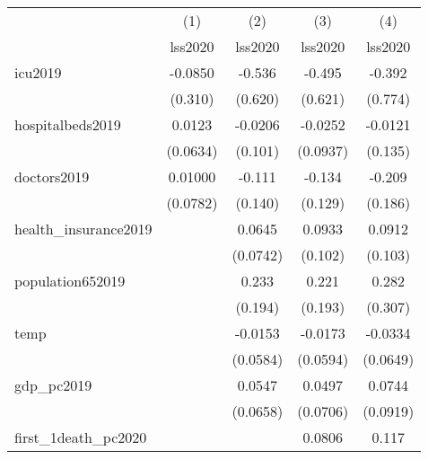 {
\def\sym#1{\ifmmode^{#1}\else\(^{#1}\)\fi}
\begin{tabular}{l*{4}{c}}
\hline\hline
            &\multicolumn{1}{c}{(1)}&\multicolumn{1}{c}{(2)}&\multicolumn{1}{c}{(3)}&\multicolumn{1}{c}{(4)}\\
            &\multicolumn{1}{c}{lss2020}&\multicolumn{1}{c}{lss2020}&\multicolumn{1}{c}{lss2020}&\multicolumn{1}{c}{lss2020}\\
\hline
icu2019     &     -0.0850         &      -0.536         &      -0.495         &      -0.392         \\
            &     (0.310)         &     (0.620)         &     (0.621)         &     (0.774)         \\
[1em]
hospitalbeds2019&      0.0123         &     -0.0206         &     -0.0252         &     -0.0121         \\
            &    (0.0634)         &     (0.101)         &    (0.0937)         &     (0.135)         \\
[1em]
doctors2019 &     0.01000         &      -0.111         &      -0.134         &      -0.209         \\
            &    (0.0782)         &     (0.140)         &     (0.129)         &     (0.186)         \\
[1em]
health\_insurance2019&                     &      0.0645         &      0.0933         &      0.0912         \\
            &                     &    (0.0742)         &     (0.102)         &     (0.103)         \\
[1em]
population652019&                     &       0.233         &       0.221         &       0.282         \\
            &                     &     (0.194)         &     (0.193)         &     (0.307)         \\
[1em]
temp        &                     &     -0.0153         &     -0.0173         &     -0.0334         \\
            &                     &    (0.0584)         &    (0.0594)         &    (0.0649)         \\
[1em]
gdp\_pc2019  &                     &      0.0547         &      0.0497         &      0.0744         \\
            &                     &    (0.0658)         &    (0.0706)         &    (0.0919)         \\
[1em]
first\_1death\_pc2020&                     &                     &      0.0806         &       0.117         \\

\end{tabular}}
